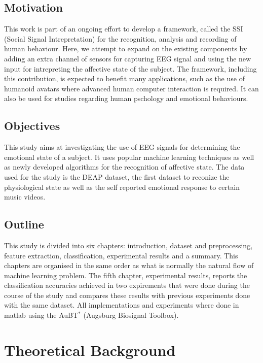 \documentclass[12pt, a4paper, fleqn]{memoir}%
\begin{document}
\section{Motivation}
\label{sec:Motivation}
This work is part of an ongoing effort to develop a framework, called the SSI (Social Signal Intrepretation) for the recognition, analysis and recording of human behaviour. Here, we attempt to expand on the existing components by adding an extra channel of sensors for capturing EEG signal and using the new input for intrepreting the affective state of the subject. The framework, including this contribution, is expected to benefit many applications, such as the use of humanoid avatars where advanced human computer interaction is required. It can also be used for studies regarding human pschology and emotional behaviours.
\section{Objectives}
\label{sec:Objectives}
This study aims at investigating the use of EEG signals for determining the emotional state of a subject. It uses popular machine learning techniques as well as newly developed algorithms for the recognition of affective state. The data used for the study is the DEAP dataset, the first dataset to reconize the physiological state as well as the self reported emotional response to certain music videos. 
\section{Outline}
\label{sec:Outline}
This study is divided into six chapters: introduction, dataset and preprocessing, feature extraction, classification, experimental results and a summary. This chapters are organised in the same order as what is normally the natural flow of machine learning problem. The fifth chapter, experimental results, reports the classification accuracies achieved in two expirements that were done during the course of the study and compares these results with previous experiments done with the same dataset. All implementations and experiments where done in matlab using the AuBT$^{*}$ (Augsburg Biosignal Toolbox).

\chapter{Theoretical Background}
\label{chap:TheoraticalBackground}
\end{document}
